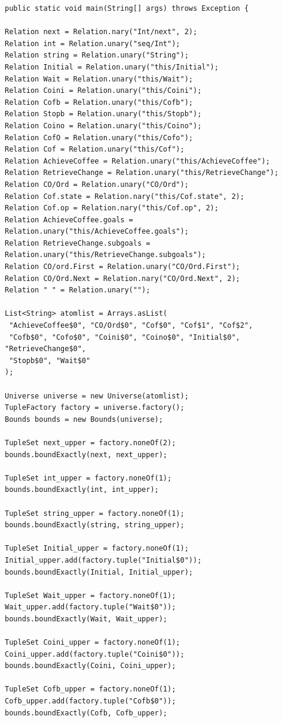 \documentclass[a4paper,12pt]{report}
\begin{document}
\begin{verbatim}
public static void main(String[] args) throws Exception {

Relation next = Relation.nary("Int/next", 2);
Relation int = Relation.unary("seq/Int");
Relation string = Relation.unary("String");
Relation Initial = Relation.unary("this/Initial");
Relation Wait = Relation.unary("this/Wait");
Relation Coini = Relation.unary("this/Coini");
Relation Cofb = Relation.unary("this/Cofb");
Relation Stopb = Relation.unary("this/Stopb");
Relation Coino = Relation.unary("this/Coino");
Relation CofO = Relation.unary("this/Cofo");
Relation Cof = Relation.unary("this/Cof");
Relation AchieveCoffee = Relation.unary("this/AchieveCoffee");
Relation RetrieveChange = Relation.unary("this/RetrieveChange");
Relation CO/Ord = Relation.unary("CO/Ord");
Relation Cof.state = Relation.nary("this/Cof.state", 2);
Relation Cof.op = Relation.nary("this/Cof.op", 2);
Relation AchieveCoffee.goals = Relation.unary("this/AchieveCoffee.goals");
Relation RetrieveChange.subgoals = Relation.unary("this/RetrieveChange.subgoals");
Relation CO/ord.First = Relation.unary("CO/Ord.First");
Relation CO/Ord.Next = Relation.nary("CO/Ord.Next", 2);
Relation " " = Relation.unary("");

List<String> atomlist = Arrays.asList(
 "AchieveCoffee$0", "CO/Ord$0", "Cof$0", "Cof$1", "Cof$2",
 "Cofb$0", "Cofo$0", "Coini$0", "Coino$0", "Initial$0", "RetrieveChange$0",
 "Stopb$0", "Wait$0"
);

Universe universe = new Universe(atomlist);
TupleFactory factory = universe.factory();
Bounds bounds = new Bounds(universe);

TupleSet next_upper = factory.noneOf(2);
bounds.boundExactly(next, next_upper);

TupleSet int_upper = factory.noneOf(1);
bounds.boundExactly(int, int_upper);

TupleSet string_upper = factory.noneOf(1);
bounds.boundExactly(string, string_upper);

TupleSet Initial_upper = factory.noneOf(1);
Initial_upper.add(factory.tuple("Initial$0"));
bounds.boundExactly(Initial, Initial_upper);

TupleSet Wait_upper = factory.noneOf(1);
Wait_upper.add(factory.tuple("Wait$0"));
bounds.boundExactly(Wait, Wait_upper);

TupleSet Coini_upper = factory.noneOf(1);
Coini_upper.add(factory.tuple("Coini$0"));
bounds.boundExactly(Coini, Coini_upper);

TupleSet Cofb_upper = factory.noneOf(1);
Cofb_upper.add(factory.tuple("Cofb$0"));
bounds.boundExactly(Cofb, Cofb_upper);


\end{verbatim}
\end{document}
